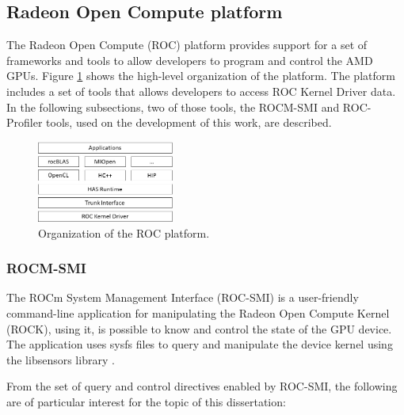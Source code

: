 \subsection{Radeon Open Compute platform}

The Radeon Open Compute (ROC) \cite{noauthor_radeonopencompute/rocm_2019} platform provides support for a set of frameworks and tools to allow developers to program and control the AMD GPUs. Figure \ref{fig:rocmplatform} shows the high-level organization of the platform. The platform includes a set of tools that allows developers to access ROC Kernel Driver data. In the following subsections, two of those tools, the ROCM-SMI \cite{noauthor_radeonopencompute/roc-smi_2019} and ROC-Profiler \cite{noauthor_rocm-developer-tools/rocprofiler_2019} tools, used on the development of this work, are described.

\begin{figure}[!htb]
  \centering
  \includegraphics[width=0.4\textwidth]{Figures/StateArt/ROC_stack.jpg}
  \caption{Organization of the ROC platform.}
  \label{fig:rocmplatform}
\end{figure}

\subsubsection{ROCM-SMI}
The ROCm System Management Interface (ROC-SMI) \cite{noauthor_radeonopencompute/roc-smi_2019} is a user-friendly command-line application for manipulating the Radeon Open Compute Kernel (ROCK),  using it, is possible to know and control the state of the GPU device. The application uses sysfs files to query and manipulate the device kernel using the libsensors library \cite{noauthor_libsensors3:_nodate}.

From the set of query and control directives enabled by ROC-SMI, the following are of particular interest for the topic of this dissertation:


